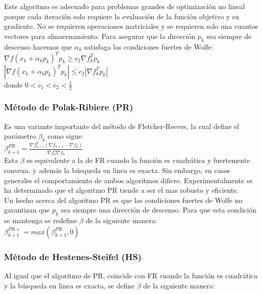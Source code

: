 \documentclass[10pt,journal,compsoc]{styles/IEEEtran}
\begin{document}
Este algoritmo es adecuado para problemas grandes de optimización no lineal porque cada iteración solo requiere la evaluación de la función objetivo y su gradiente. No se requieren operaciones matriciales y se requieren solo una cuantos vectores para almacenamiento. Para asegurar que la dirección $p_k$ sea siempre de descenso hacemos que $\alpha_k$ satisfaga las condiciones fuertes de Wolfe:\\

$\nabla f(x_k+\alpha_k p_k)^Tp_k \geq c_2 \nabla f_k^T p_k$\\

$|\nabla f(x_k+\alpha_k p_k)^Tp_k| \leq c_2| \nabla f_k^T p_k|$\\

donde $0<c_1<c_2<\frac{1}{2}$\\

\subsubsection{M\'etodo de Polak-Ribiere (PR)}

Es una variante importante del método de Fletcher-Reeves, la cual define el parámetro $\beta_k$ como sigue:\\

$\beta_{k+1}^{PR}=\frac{\nabla f_{k+1}^T (\nabla f_{k+1}- \nabla f_{k})}{\nabla f_{k}^T \nabla f_{k}}$\\

Esta $\beta$ es equivalente a la de FR cuando la función es cuadrática y fuertemente convexa, y además la búsqueda en linea es exacta. Sin embargo, en casos generales el comportamiento de ambos algoritmos difiere. Experimentalmente se ha determinado que el algoritmo PR tiende a ser el mas robusto y eficiente.\\

Un hecho acerca del algoritmo PR es que las condiciones fuertes de Wolfe no garantizan que $p_k$ sea siempre una dirección de descenso. Para que esta condición se mantenga se redefine $\beta$ de la siguiente manera:\\

$\beta_{k+1}^{PR+}=max(\beta_{k+1}^{PR},0)$\\

\subsubsection{M\'etodo de Hestenes-Steifel (HS)}

Al igual que el algoritmo de PR, coincide con FR cuando la función es cuadrática y la búsqueda en linea es exacta, se define $\beta$ de la siguiente manera:\\
\end{document}
